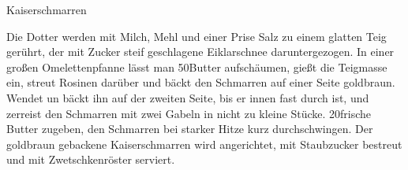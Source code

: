 \begin{recipe}{Kaiserschmarren}
%
%
%
%
%

\begin{ingredients}
\end{ingredients}

\begin{instructions}
    Die Dotter werden mit Milch, Mehl und einer Prise Salz zu einem glatten Teig gerührt, der mit Zucker steif geschlagene Eiklarschnee daruntergezogen.
    In einer großen Omelettenpfanne lässt man 50\gram Butter aufschäumen, gießt die Teigmasse ein, streut Rosinen darüber und bäckt den Schmarren auf einer Seite goldbraun.
    Wendet un bäckt ihn auf der zweiten Seite, bis er innen fast durch ist, und zerreist den Schmarren mit zwei Gabeln in nicht zu kleine Stücke.
    20\gram frische Butter zugeben, den Schmarren bei starker Hitze kurz durchschwingen.
    Der goldbraun gebackene Kaiserschmarren wird angerichtet, mit Staubzucker bestreut und mit Zwetschkenröster serviert.
\end{instructions}
\end{recipe}
